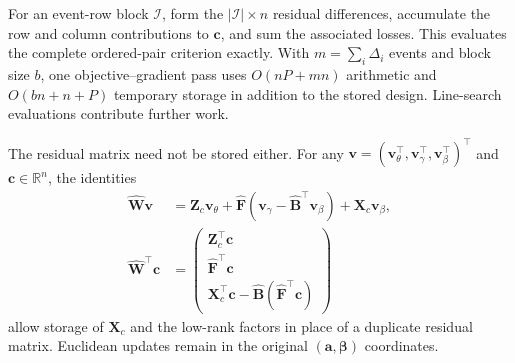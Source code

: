 For an event-row block $\mathcal I$, form the $|\mathcal I|\times n$ residual differences, accumulate the row and column contributions to $\bm{c}$, and sum the associated losses. This evaluates the complete ordered-pair criterion exactly. With $m=\sum_i\Delta_i$ events and block size $b$, one objective--gradient pass uses $O(nP+mn)$ arithmetic and $O(bn+n+P)$ temporary storage in addition to the stored design. Line-search evaluations contribute further work.

The residual matrix need not be stored either. For any $\bm{v}=(\bm{v}_\theta^\top,\bm{v}_\gamma^\top,\bm{v}_\beta^\top)^\top$ and $\bm{c}\in\mathbb R^n$, the identities
\begin{equation}
 \begin{split}
 \widehat{\bm{W}}\bm{v}&=\bm{Z}_c\bm{v}_\theta+\widehat{\bm{F}}(\bm{v}_\gamma-\widehat{\bm{B}}^\top \bm{v}_\beta)+\bm{X}_c\bm{v}_\beta,\\
 \widehat{\bm{W}}^\top \bm{c}&=
 \begin{pmatrix}\bm{Z}_c^\top \bm{c}\\ \widehat{\bm{F}}^\top \bm{c}\\
 \bm{X}_c^\top \bm{c}-\widehat{\bm{B}}(\widehat{\bm{F}}^\top \bm{c})\end{pmatrix}
 \end{split}
 \label{eq:comp-implicit-W}
\end{equation}
allow storage of $\bm{X}_c$ and the low-rank factors in place of a duplicate residual matrix. Euclidean updates remain in the original $(\bm{a},\bm{\beta})$ coordinates.

